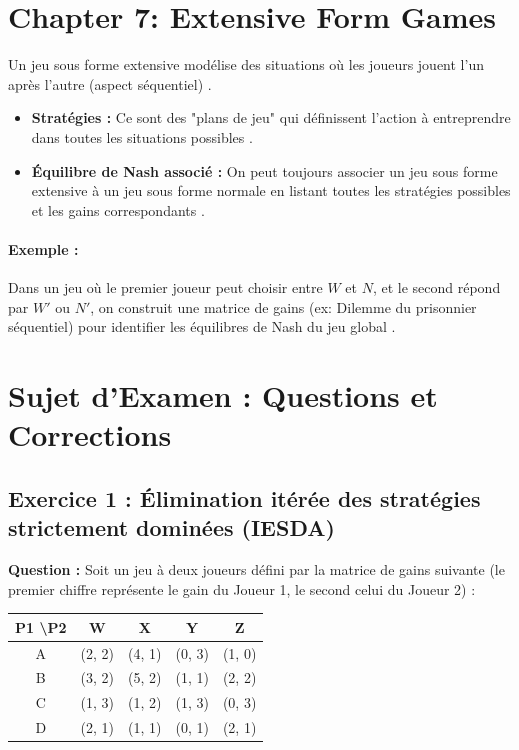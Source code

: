 \section{Chapter 7: Extensive Form Games}

Un jeu sous forme extensive modélise des situations où les joueurs jouent l'un après l'autre (aspect séquentiel) \cite{Note 10 déc. 2025.pdf}.

\begin{itemize}
    \item \textbf{Stratégies :} Ce sont des "plans de jeu" qui définissent l'action à entreprendre dans toutes les situations possibles \cite{Note 10 déc. 2025.pdf}.
    \item \textbf{Équilibre de Nash associé :} On peut toujours associer un jeu sous forme extensive à un jeu sous forme normale en listant toutes les stratégies possibles et les gains correspondants \cite{Note 10 déc. 2025.pdf}.
\end{itemize}

\paragraph{Exemple :} Dans un jeu où le premier joueur peut choisir entre $W$ et $N$, et le second répond par $W'$ ou $N'$, on construit une matrice de gains (ex: Dilemme du prisonnier séquentiel) pour identifier les équilibres de Nash du jeu global \cite{Note 10 déc. 2025.pdf}.

\section{Sujet d'Examen : Questions et Corrections}

\subsection{Exercice 1 : Élimination itérée des stratégies strictement dominées (IESDA)}

\textbf{Question :}
Soit un jeu à deux joueurs défini par la matrice de gains suivante (le premier chiffre représente le gain du Joueur 1, le second celui du Joueur 2) \cite{Note 24 nov. 2025 (4).pdf} :

\begin{center}
\begin{tabular}{c|cccc}
P1 \textbackslash P2 & W & X & Y & Z \\ \hline
A & (2, 2) & (4, 1) & (0, 3) & (1, 0) \\
B & (3, 2) & (5, 2) & (1, 1) & (2, 2) \\
C & (1, 3) & (1, 2) & (1, 3) & (0, 3) \\
D & (2, 1) & (1, 1) & (0, 1) & (2, 1)
\end{tabular}
\end{center}

